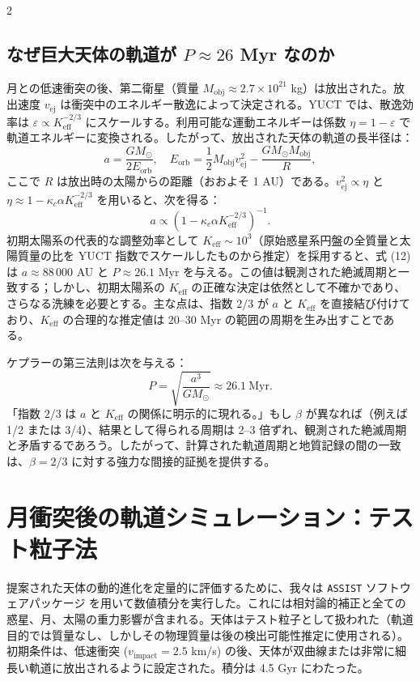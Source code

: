 \documentclass[12pt,a4paper]{article}
\begin{document}
\begin{multicols}{2}
		\subsection{なぜ巨大天体の軌道が \(P \approx 26\) Myr なのか}
		月との低速衝突の後、第二衛星（質量 \(M_{\text{obj}} \approx 2.7\times10^{21}\) kg）は放出された。放出速度 \(v_{\text{ej}}\) は衝突中のエネルギー散逸によって決定される。YUCT では、散逸効率は \(\varepsilon \propto K_{\mathrm{eff}}^{-2/3}\) にスケールする。利用可能な運動エネルギーは係数 \(\eta = 1 - \varepsilon\) で軌道エネルギーに変換される。したがって、放出された天体の軌道の長半径は：
		\[
		a = \frac{GM_{\odot}}{2E_{\text{orb}}}, \quad E_{\text{orb}} = \frac{1}{2} M_{\text{obj}} v_{\text{ej}}^2 - \frac{GM_{\odot}M_{\text{obj}}}{R},
		\]
		ここで \(R\) は放出時の太陽からの距離（おおよそ 1 AU）である。\(v_{\text{ej}}^2 \propto \eta\) と \(\eta \approx 1 - \kappa_c \alpha K_{\mathrm{eff}}^{-2/3}\) を用いると、次を得る：
		\[
		a \propto \left(1 - \kappa_c \alpha K_{\mathrm{eff}}^{-2/3}\right)^{-1}.
		\]
		初期太陽系の代表的な調整効率として \(K_{\mathrm{eff}} \sim 10^3\)（原始惑星系円盤の全質量と太陽質量の比を YUCT 指数でスケールしたものから推定）を採用すると、式 (12) は \(a \approx 88\,000\) AU と \(P \approx 26.1\) Myr を与える。この値は観測された絶滅周期と一致する；しかし、初期太陽系の \(K_{\mathrm{eff}}\) の正確な決定は依然として不確かであり、さらなる洗練を必要とする。主な点は、指数 \(2/3\) が \(a\) と \(K_{\mathrm{eff}}\) を直接結び付けており、\(K_{\mathrm{eff}}\) の合理的な推定値は 20–30 Myr の範囲の周期を生み出すことである。
		
		ケプラーの第三法則は次を与える：
		\[
		P = \sqrt{\frac{a^3}{GM_{\odot}}} \approx 26.1\ \text{Myr}.
		\]
		「指数 \(2/3\) は \(a\) と \(K_{\mathrm{eff}}\) の関係に明示的に現れる。」もし \(\beta\) が異なれば（例えば 1/2 または 3/4）、結果として得られる周期は 2–3 倍ずれ、観測された絶滅周期と矛盾するであろう。したがって、計算された軌道周期と地質記録の間の一致は、\(\beta = 2/3\) に対する強力な間接的証拠を提供する。
		
		\section{月衝突後の軌道シミュレーション：テスト粒子法}
		提案された天体の動的進化を定量的に評価するために、我々は \texttt{ASSIST} ソフトウェアパッケージ \cite{Tamayo2020} を用いて数値積分を実行した。これには相対論的補正と全ての惑星、月、太陽の重力影響が含まれる。天体はテスト粒子として扱われた（軌道目的では質量なし、しかしその物理質量は後の検出可能性推定に使用される）。初期条件は、低速衝突 (\(v_{\text{impact}} = 2.5\) km/s) の後、天体が双曲線または非常に細長い軌道に放出されるように設定された。積分は 4.5 Gyr にわたった。
		

\end{multicols}
\end{document}
